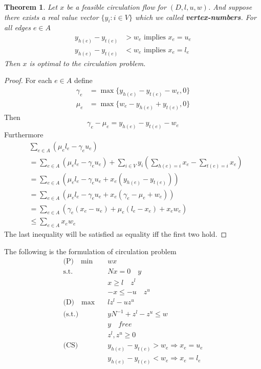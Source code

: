 \documentclass[10pt, twocolumn]{book}
\theoremstyle{definition}
\theoremstyle{plain}
\newtheorem{theorem}{Theorem}[chapter]
\theoremstyle{remark}
\begin{document}
			\begin{theorem}
				Let $x$ be a feasible circulation flow for $(D, l, u, w)$. And suppose there exists a real value vector $\{y_i: i \in V\}$ which we called \textbf{vertex-numbers}. For all edges $e\in A$
				\begin{align}
					y_{h(e)} - y_{t(e)} &> w_e \text{ implies } x_e = u_e\\
					y_{h(e)} - y_{t(e)} &< w_e \text{ implies } x_e = l_e
				\end{align}
				Then $x$ is optimal to the circulation problem.
			\end{theorem}

			\begin{proof}
				For each $e \in A$ define
				\begin{align}
					\gamma_e &= \max\{y_{h(e)} - y_{t(e)} - w_e, 0\} \\
					\mu_e &= \max\{w_e - y_{h(e)} + y_{t(e)}, 0\}
				\end{align}
				Then
				\begin{equation}
					\gamma_e - \mu_e = y_{h(e)} - y_{t(e)} - w_e
				\end{equation}
				Furthermore
				\begin{align}
					&\sum_{e\in A} (\mu_el_e - \gamma_eu_e) \\
					&= \sum_{e\in A} (\mu_el_e - \gamma_eu_e) + \sum_{i \in V}y_i(\sum_{h(e) = i} x_e - \sum_{t(e) = i} x_e)\\
					&= \sum_{e\in A} (\mu_el_e - \gamma_eu_e + x_e(y_{h(e)} - y_{t(e)}))\\
					&= \sum_{e\in A} (\mu_el_e - \gamma_eu_e + x_e(\gamma_e - \mu_e + w_e))\\
					&= \sum_{e\in A} (\gamma_e(x_e - u_e) + \mu_e(l_e - x_e) + x_ew_e)\\
					&\le \sum_{e\in A} x_ew_e 
				\end{align}
				The last inequality will be satisfied as equality iff the first two hold.
			\end{proof}

			The following is the formulation of circulation problem
			\begin{align}
				\text{(P)} \quad \min \quad & wx\\
				\text{s.t.} \quad & Nx = 0 \quad y \\
								  & x \ge l \quad z^l \\
								  & -x \le -u \quad z^u\\
				\text{(D)} \quad \max \quad & lz^l - uz^u \\
				\text{(s.t.)} \quad & yN^{-1} + z^l-z^u \le w\\
									& y \quad free\\
									&z^l, z^u \ge 0 \\
				\text{(CS)} \quad & y_{h(e)} - y_{t(e)} > w_e \Rightarrow x_e = u_e\\
								  & y_{h(e)} - y_{t(e)} < w_e \Rightarrow x_e = l_e
			\end{align}
\end{document}
